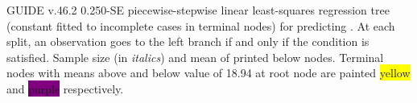 \documentclass[12pt]{article}
\begin{document}
 \begin{center}
 \end{center}
GUIDE v.46.2 0.250-SE
piecewise-stepwise linear least-squares regression tree
 (constant fitted to incomplete cases in terminal nodes)
for predicting \texttt{}.
At each split, an observation goes to the left branch 
 if and only if the condition is satisfied.
Sample size (in \emph{italics}) and mean of \texttt{} printed below nodes.
 Terminal nodes with means above and below value of 18.94 at root node are painted \colorbox{yellow}{yellow} and \colorbox{purple}{purple} respectively.
 
\end{document}
